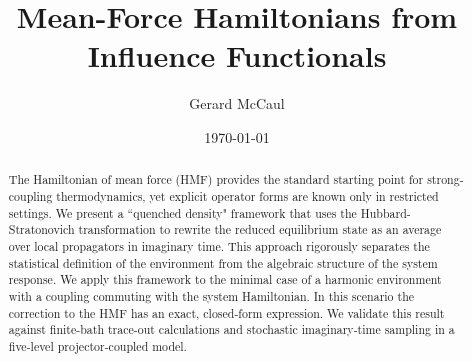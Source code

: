 \documentclass[aps,prl,twocolumn,superscriptaddress,showpacs,floatfix]{revtex4-2}
\begin{document}
\title{Mean-Force Hamiltonians from Influence Functionals}
\author{Gerard McCaul}
\date{\today}

\begin{abstract}
The Hamiltonian of mean force (HMF) provides the standard starting point for strong-coupling thermodynamics, yet explicit operator forms are known only in restricted settings. We present a ``quenched density" framework that uses the Hubbard-Stratonovich transformation to rewrite the reduced equilibrium state as an average over local propagators in imaginary time. This approach rigorously separates the statistical definition of the environment from the algebraic structure of the system response. We apply this framework to the minimal case of a harmonic environment with a coupling commuting with the system Hamiltonian. In this scenario the correction to the HMF has an exact, closed-form expression. We validate this result against finite-bath trace-out calculations and stochastic imaginary-time sampling in a five-level projector-coupled model.
\end{abstract}

\maketitle





% 





\end{document}
